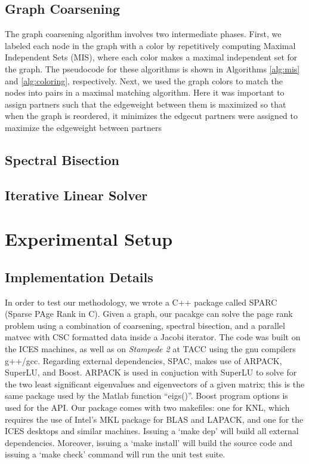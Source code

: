 \documentclass[11pt]{article}
\begin{document}
\subsection{Graph Coarsening}

The graph coarsening algorithm involves two intermediate phases. First, we
labeled each node in the graph with a color by repetitively computing Maximal
Independent Sets (MIS), where each color makes a maximal independent set for the
graph. The pseudocode for these algorithms is shown in
Algorithms \ref{alg:mis} and \ref{alg:coloring}, respectively. Next, we used the
graph colors to match the nodes into pairs in a maximal matching algorithm. Here
it was important to assign partners such that the edgeweight between them is
maximized so that when the graph is reordered, it minimizes the edgecut partners
were assigned to maximize the edgeweight between partners 


\subsection{Spectral Bisection}

\subsection{Iterative Linear Solver}




\section{Experimental Setup}
\subsection{Implementation Details}

In order to test our methodology, we wrote a C++
package called {\rm SPARC} (Sparse PAge Rank in C). Given a
graph, our pacakge can solve the page rank problem using a combination of coarsening, spectral
bisection, and a parallel matvec with CSC formatted data inside a Jacobi
iterator. The code was built on the ICES machines, as well as on \textit{Stampede 2} at TACC using the gnu
compilers g++/gcc. Regarding external dependencies, {\rm SPAC}, makes use of
{\rm ARPACK}, {\rm SuperLU}, and {\rm Boost}. {\rm ARPACK} is used in conjuction
with {\rm SuperLU} to solve for the two least significant eigenvalues and
eigenvectors of a given
matrix; this is the same package used by the Matlab function ``eigs()''. {\rm
Boost} program options is used for the API. Our package comes with two
makefiles: one for KNL, which requires the use of Intel's MKL package for BLAS
and LAPACK, and one for the ICES desktops and similar machines. Issuing a `make
dep' will build all external dependencies. Moreover, issuing a `make install' will
build the source code and issuing a `make check' command will run the unit test suite.  
\end{document}
